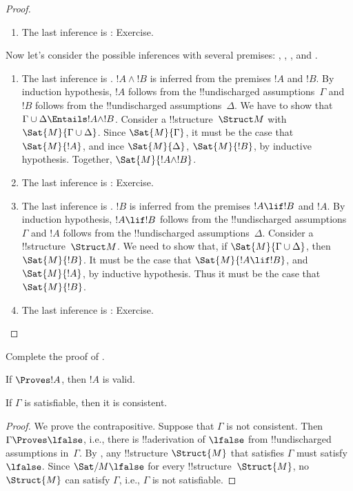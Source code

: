 \documentclass[../../include/open-logic-section]{subfiles}
\begin{document}
\begin{proof}
\begin{enumerate}
\item The last inference is \Elim{\forall}: Exercise.
\end{enumerate}

Now let's consider the possible inferences with several premises:
\Elim{\lor}, \Intro{\land}, \Elim{\lif}, and \Elim{\lexists}.
\begin{enumerate}

\item The last inference is \Intro{\land}. $!A \land !B$ is inferred
  from the premises $!A$ and $!B$. By induction hypothesis, $!A$
  follows from the !!{undischarged} assumptions~$\Gamma$ and $!B$
  follows from the !!{undischarged} assumptions~$\Delta$. We have to
  show that $\Gamma \cup \Delta \Entails !A \land !B$. Consider a
  !!{structure}~$\Struct M$ with $\Sat{M}{\Gamma \cup \Delta}$. Since
  $\Sat{M}{\Gamma}$, it must be the case that $\Sat{M}{!A}$, and ince
  $\Sat{M}{\Delta}$, $\Sat{M}{!B}$, by inductive hypothesis.
  Together, $\Sat{M}{!A \land !B}$.
  
\item The last inference is \Elim{\lor}: Exercise.

\item The last inference is \Elim{\lif}. $!B$ is inferred from the
  premises $!A \lif !B$ and $!A$. By induction hypothesis, $!A \lif
  !B$ follows from the !!{undischarged} assumptions~$\Gamma$ and $!A$
  follows from the !!{undischarged} assumptions~$\Delta$. Consider a
  !!{structure}~$\Struct M$. We need to show that, if $\Sat{M}{\Gamma
    \cup \Delta}$, then $\Sat{M}{!B}$.  It must be the case that
  $\Sat{M}{!A \lif !B}$, and $\Sat{M}{!A}$, by inductive hypothesis.
  Thus it must be the case that $\Sat{M}{!B}$.
    
\item The last inference is \Elim{\lexists}: Exercise.
\end{enumerate}
\end{proof}

\begin{prob}
Complete the proof of .
\end{prob}

\begin{cor}
If $\Proves !A$, then $!A$ is valid.
\end{cor}

\begin{cor}
If $\Gamma$ is satisfiable, then it is consistent.
\end{cor}

\begin{proof}
We prove the contrapositive.  Suppose that $\Gamma$ is not consistent.
Then $\Gamma \Proves \lfalse$, i.e., there is !!a{derivation} of
$\lfalse$ from !!{undischarged} assumptions in~$\Gamma$. By
, any !!{structure} $\Struct{M}$ that satisfies
$\Gamma$ must satisfy $\lfalse$.  Since $\Sat/{M}{\lfalse}$ for every
!!{structure}~$\Struct{M}$, no $\Struct{M}$ can satisfy $\Gamma$,
i.e., $\Gamma$ is not satisfiable.
\end{proof}
\end{document}
